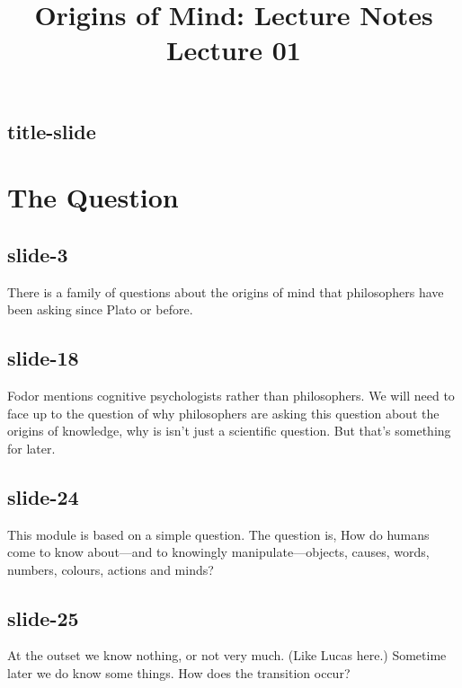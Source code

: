 \documentclass[12pt,\papersize]{extarticle}
\begin{document}
\setlength\footnotesep{1em}









 
\title {Origins of Mind: Lecture Notes \\ Lecture 01}
 
\maketitle
 
 
\subsection{title-slide}
 
\section{The Question}
 
 
\subsection{slide-3}
There is a family of questions about the origins of mind that philosophers have been asking since Plato or before.
 
 
\subsection{slide-18}
Fodor mentions cognitive psychologists rather than philosophers. We will need to face up to the question of why philosophers are asking this question about the origins of knowledge, why is isn't just a scientific question. But that's something for later.
 
 
\subsection{slide-24}
This module is based on a simple question.
The question is,
How do humans come to know about---and to knowingly manipulate---objects, causes, words, numbers, colours, actions and minds?
 
 
\subsection{slide-25}
At the outset we know nothing, or not very much. (Like Lucas here.)
Sometime later we do know some things.
How does the transition occur?
 
\end{document}
